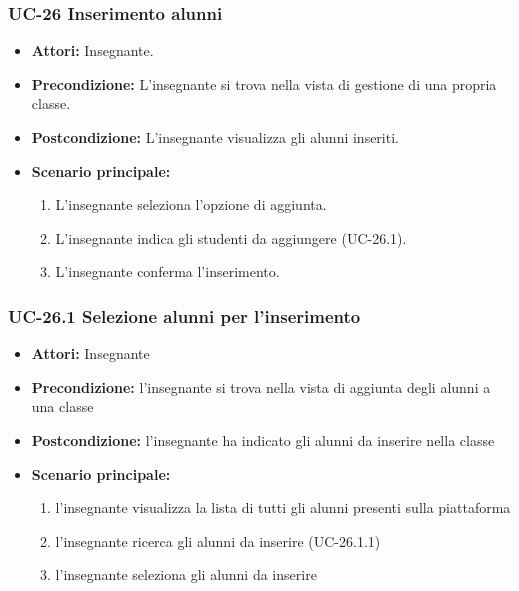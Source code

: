\subsubsection{UC-26 Inserimento alunni}
\begin{itemize}
	\item \textbf{Attori:} Insegnante.
	\item \textbf{Precondizione:} L'insegnante si trova nella vista di gestione di una propria classe.
	\item \textbf{Postcondizione:} L'insegnante visualizza gli alunni inseriti.
	\item \textbf{Scenario principale:}
	\begin{enumerate}
		\item L'insegnante seleziona l'opzione di aggiunta.
		\item L'insegnante indica gli studenti da aggiungere (UC-26.1).
		\item L'insegnante conferma l'inserimento.
	\end{enumerate}
\end{itemize}

\subsubsection{UC-26.1 Selezione alunni per l'inserimento}
\begin{itemize}
	\item \textbf{Attori:} Insegnante
	\item \textbf{Precondizione:} l'insegnante si trova nella vista di aggiunta degli alunni a una classe
	\item \textbf{Postcondizione:} l'insegnante ha indicato gli alunni da inserire nella classe
	\item \textbf{Scenario principale:}
	\begin{enumerate}
		\item l'insegnante visualizza la lista di tutti gli alunni presenti sulla piattaforma
		\item l'insegnante ricerca gli alunni da inserire (UC-26.1.1)	
		\item l'insegnante seleziona gli alunni da inserire
	\end{enumerate}
\end{itemize}

